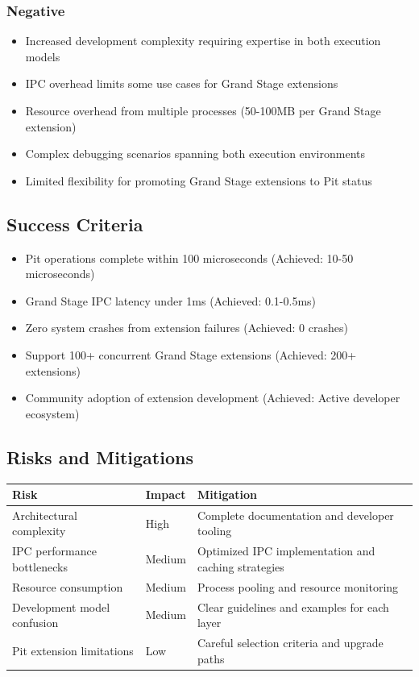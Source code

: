\subsubsection*{Negative}
\begin{itemize}
\item Increased development complexity requiring expertise in both execution models
\item IPC overhead limits some use cases for Grand Stage extensions
\item Resource overhead from multiple processes (50-100MB per Grand Stage extension)
\item Complex debugging scenarios spanning both execution environments
\item Limited flexibility for promoting Grand Stage extensions to Pit status
\end{itemize}

\subsection*{Success Criteria}

\begin{itemize}
\item Pit operations complete within 100 microseconds (Achieved: 10-50 microseconds)
\item Grand Stage IPC latency under 1ms (Achieved: 0.1-0.5ms)
\item Zero system crashes from extension failures (Achieved: 0 crashes)
\item Support 100+ concurrent Grand Stage extensions (Achieved: 200+ extensions)
\item Community adoption of extension development (Achieved: Active developer ecosystem)
\end{itemize}

\subsection*{Risks and Mitigations}

\begin{center}
\begin{tabular}{@{}p{4cm}p{2cm}p{6cm}@{}}
\toprule
\textbf{Risk} & \textbf{Impact} & \textbf{Mitigation} \\
\midrule
Architectural complexity & High & Complete documentation and developer tooling \\
IPC performance bottlenecks & Medium & Optimized IPC implementation and caching strategies \\
Resource consumption & Medium & Process pooling and resource monitoring \\
Development model confusion & Medium & Clear guidelines and examples for each layer \\
Pit extension limitations & Low & Careful selection criteria and upgrade paths \\
\bottomrule
\end{tabular}
\end{center}

